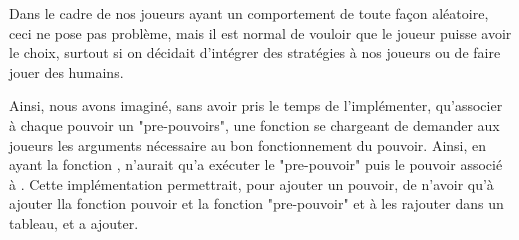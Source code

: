 Dans le cadre de nos joueurs ayant un comportement de toute façon aléatoire, ceci ne pose pas problème, mais il est normal de vouloir que le joueur puisse avoir le choix, surtout si on décidait d'intégrer des stratégies à nos joueurs ou de faire jouer des humains.

Ainsi, nous avons imaginé, sans avoir pris le temps de l'implémenter, qu'associer à chaque pouvoir un "pre-pouvoirs", une fonction se chargeant de demander aux joueurs les arguments nécessaire au bon fonctionnement du pouvoir. Ainsi, en ayant la fonction , n'aurait qu'a exécuter le "pre-pouvoir" puis le pouvoir associé à . Cette implémentation permettrait, pour ajouter un pouvoir, de n'avoir qu'à ajouter lla fonction pouvoir et la fonction "pre-pouvoir" et à les rajouter dans un tableau, et a ajouter.






